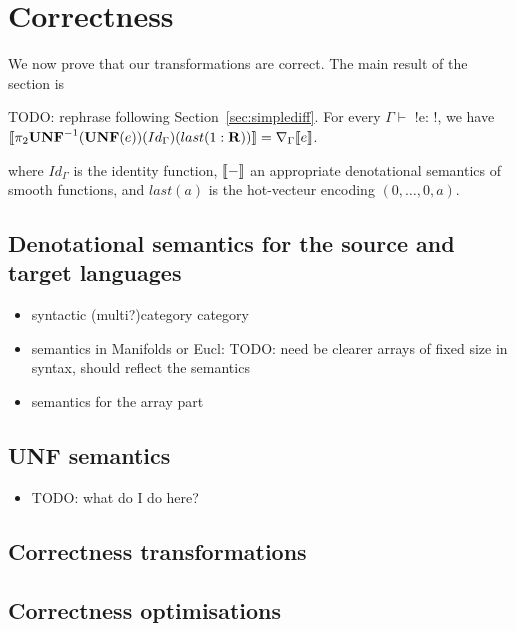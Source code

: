 \section{Correctness}
\label{sec:correctness}

We now prove that our transformations are correct. 
 The main result of the section is

 \begin{theorem}
    TODO: rephrase following Section~\ref{sec:simplediff}.
     For every $\Gamma \vdash$ !e: \reals!, we have 
     $\llbracket \pi_2 \mathbf{UNF}^{-1}(\mathbf{UNF}(e))(Id_\Gamma)(last(1:\mathbf{R}))\rrbracket= \nabla_{\Gamma}\llbracket e\rrbracket$.
 \end{theorem}
 where $Id_\Gamma$ is the identity function, 
 $\llbracket -\rrbracket$ an appropriate denotational semantics of smooth functions,
 and $last(a)$ is the hot-vecteur encoding $(0,\ldots,0,a)$. 

\subsection{Denotational semantics for the source and target languages} 


\begin{itemize}
    \item syntactic (multi?)category category
    \item semantics in Manifolds or Eucl: TODO: need be clearer arrays of fixed size in syntax, should reflect the semantics
    \item semantics for the array part
\end{itemize}

 \subsection{UNF semantics} %
 \label{sub:UNF semantics}
 
\begin{itemize}
    \item TODO: what do I do here?
\end{itemize}


 \subsection{Correctness transformations} %
 \label{sub:Correctness transformations}


 \subsection{Correctness optimisations} %
 \label{sub:Correctness optimisations}
 
